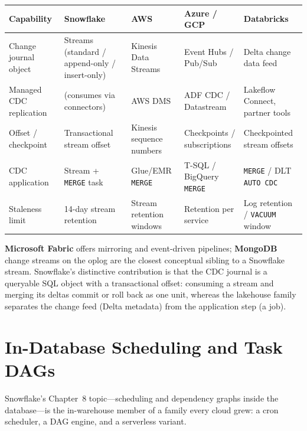 \begin{center}
\footnotesize
\begin{tabular}{@{}p{2.5cm}p{2.9cm}p{2.7cm}p{2.9cm}p{2.9cm}@{}}
\toprule
\textbf{Capability} & \textbf{Snowflake} & \textbf{AWS} & \textbf{Azure / GCP} & \textbf{Databricks} \\
\midrule
Change journal object & Streams (standard / append-only / insert-only) & Kinesis Data Streams & Event Hubs / Pub/Sub & Delta change data feed \\
Managed CDC replication & (consumes via connectors) & AWS DMS & ADF CDC / Datastream & Lakeflow Connect, partner tools \\
Offset / checkpoint & Transactional stream offset & Kinesis sequence numbers & Checkpoints / subscriptions & Checkpointed stream offsets \\
CDC application & Stream + \texttt{MERGE} task & Glue/EMR \texttt{MERGE} & T-SQL / BigQuery \texttt{MERGE} & \texttt{MERGE} / DLT \texttt{AUTO CDC} \\
Staleness limit & 14-day stream retention & Stream retention windows & Retention per service & Log retention / \texttt{VACUUM} window \\
\bottomrule
\end{tabular}
\end{center}

\noindent \textbf{Microsoft Fabric} offers mirroring and event-driven pipelines; \textbf{MongoDB}
change streams on the oplog are the closest conceptual sibling to a Snowflake stream. Snowflake's
distinctive contribution is that the CDC journal is a queryable SQL object with a transactional
offset: consuming a stream and merging its deltas commit or roll back as one unit, whereas the
lakehouse family separates the change feed (Delta metadata) from the application step (a job).

\section{In-Database Scheduling and Task DAGs}
%
Snowflake's Chapter~8 topic---scheduling and dependency graphs inside the database---is the
in-warehouse member of a family every cloud grew: a cron scheduler, a DAG engine, and a
serverless variant.

